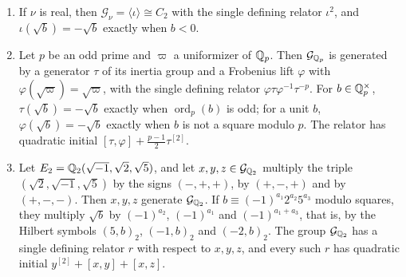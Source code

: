 \begin{lemma}\label{tw:local-groups}
\begin{enumerate}
\item[(a)] If $\nu$ is real, then $\mathcal G_\nu=\langle\iota\rangle\cong C_2$
 with the single defining relator $\iota^2$, and $\iota(\sqrt b)=-\sqrt b$
 exactly when $b<0$.
\item[(b)] Let $p$ be an odd prime and $\varpi$ a uniformizer of $\mathbb Q_p$. Then
 $\mathcal G_{\mathbb Q_p}$ is generated by a generator $\tau$ of its inertia group
 and a Frobenius lift $\varphi$ with $\varphi(\sqrt\varpi)=\sqrt\varpi$, with
 the single defining relator $\varphi\tau\varphi^{-1}\tau^{-p}$. For
 $b\in\mathbb Q_p^\times$, $\tau(\sqrt b)=-\sqrt b$ exactly when $\operatorname{ord}_p(b)$ is odd;
 for a unit $b$, $\varphi(\sqrt b)=-\sqrt b$ exactly when $b$ is not a square
 modulo $p$. The relator has quadratic initial
 $[\tau,\varphi]+\frac{p-1}2\tau^{[2]}$.
\item[(c)] Let $E_2=\mathbb Q_2(\sqrt{-1},\sqrt2,\sqrt5)$, and let
 $x,y,z\in\mathcal G_{\mathbb Q_2}$ multiply the triple $(\sqrt2,\sqrt{-1},\sqrt5)$
 by the signs $(-,+,+)$, by $(+,-,+)$ and by $(+,-,-)$. Then $x,y,z$
 generate $\mathcal G_{\mathbb Q_2}$. If $b\equiv(-1)^{a_1}2^{a_2}5^{a_3}$ modulo
 squares, they multiply $\sqrt b$ by $(-1)^{a_2}$, $(-1)^{a_1}$ and
 $(-1)^{a_1+a_3}$, that is, by the Hilbert symbols $(5,b)_2$, $(-1,b)_2$ and
 $(-2,b)_2$. The group $\mathcal G_{\mathbb Q_2}$ has a single defining relator $r$
 with respect to $x,y,z$, and every such $r$ has quadratic initial
 $y^{[2]}+[x,y]+[x,z]$.
\end{enumerate}
\end{lemma}

